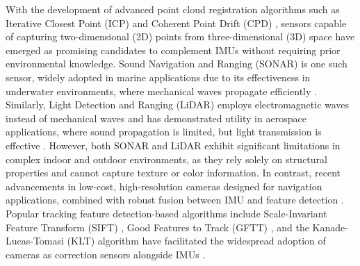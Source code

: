 With the development of advanced point cloud registration algorithms
such as Iterative Closest Point (ICP) \cite{121791} and Coherent
Point Drift (CPD) \cite{Myronenko2009PointSR}, sensors capable of
capturing two-dimensional (2D) points from three-dimensional (3D)
space have emerged as promising candidates to complement IMUs without
requiring prior environmental knowledge. Sound Navigation and Ranging
(SONAR) is one such sensor, widely adopted in marine applications
due to its effectiveness in underwater environments, where mechanical
waves propagate efficiently \cite{franchi2021underwater}. Similarly,
Light Detection and Ranging (LiDAR) employs electromagnetic waves
instead of mechanical waves and has demonstrated utility in aerospace
applications, where sound propagation is limited, but light transmission
is effective \cite{christian2013survey}. However, both SONAR and
LiDAR exhibit significant limitations in complex indoor and outdoor
environments, as they rely solely on structural properties and cannot
capture texture or color information. In contrast, recent advancements
in low-cost, high-resolution cameras designed for navigation applications,
combined with robust fusion between IMU and feature detection \cite{hashim2021geometricNAV,hashim2021gps}.
Popular tracking feature detection-based algorithms include Scale-Invariant
Feature Transform (SIFT) \cite{lowe2004distinctive}, Good Features
to Track (GFTT) \cite{shi1994good}, and the Kanade-Lucas-Tomasi (KLT)
algorithm have facilitated the widespread adoption of cameras as correction
sensors alongside IMUs \cite{7511659,mourikis2007multi,sun2018robust,hash2025_RIENG_Avionics}.
